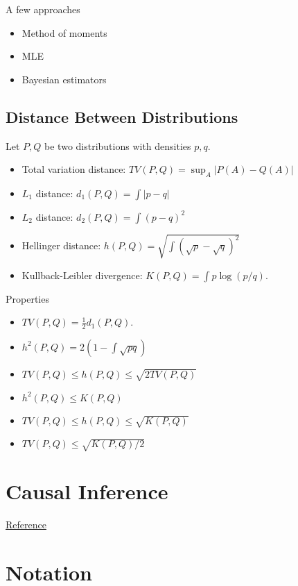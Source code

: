 \documentclass[12pt]{article}
\theoremstyle{plain}
\theoremstyle{definition}
\theoremstyle{remark}
\begin{document}
A few approaches
\begin{itemize}
  \item Method of moments
  \item MLE
  \item Bayesian estimators
\end{itemize}






\subsection{Distance Between Distributions}

Let $P,Q$ be two distributions with densities $p,q$.
\begin{itemize}
  \item Total variation distance:
    $TV(P,Q)=\sup_A|P(A)-Q(A)|$
  \item $L_1$ distance: $d_1(P,Q) = \int |p-q|$
  \item $L_2$ distance: $d_2(P,Q) = \int (p-q)^2$
  \item Hellinger distance: $h(P,Q) = \sqrt{\int (\sqrt{p}-\sqrt{q})^2}$
  \item Kullback-Leibler divergence: $K(P,Q)=\int p\log(p/q)$.
\end{itemize}
Properties
\begin{itemize}
  \item $TV(P,Q)=\frac{1}{2}d_1(P,Q)$.
  \item $h^2(P,Q)=2(1-\int \sqrt{pq})$
  \item $TV(P,Q)\leq h(P,Q)\leq \sqrt{2TV(P,Q)}$
  \item $h^2(P,Q)\leq K(P,Q)$
  \item $TV(P,Q)\leq h(P,Q)\leq \sqrt{K(P,Q)}$
  \item $TV(P,Q)\leq \sqrt{K(P,Q)/2}$
\end{itemize}






\clearpage
\section{Causal Inference}

\href{http://www.stat.cmu.edu/~larry/=stat705/Lecture17.pdf}{Reference}








\clearpage
\section{Notation}
\end{document}
